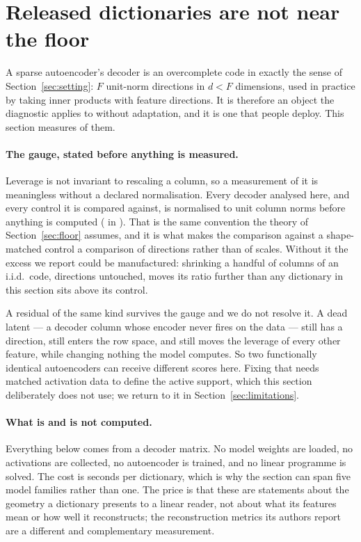 \section{Released dictionaries are not near the floor}
\label{sec:dictionaries}

A sparse autoencoder's decoder is an overcomplete code in exactly the sense of
Section~\ref{sec:setting}: $F$ unit-norm directions in $d<F$ dimensions, used in practice by taking
inner products with feature directions. It is therefore an object the diagnostic applies to without
adaptation, and it is one that people deploy. This section measures \SaeDicts{} of them.

\paragraph{The gauge, stated before anything is measured.} Leverage is not invariant to rescaling
a column, so a measurement of it is meaningless without a declared normalisation. Every decoder
analysed here, and every control it is compared against, is normalised to unit column norms before
anything is computed ( in ). That is the same
convention the theory of Section~\ref{sec:floor} assumes, and it is what makes the comparison against
a shape-matched control a comparison of directions rather than of scales. Without it the excess we
report could be manufactured: shrinking a handful of columns of an i.i.d.\ code, directions untouched,
moves its ratio further than any dictionary in this section sits above its control.

A residual of the same kind survives the gauge and we do not resolve it. A dead latent --- a decoder
column whose encoder never fires on the data --- still has a direction, still enters the row space,
and still moves the leverage of every other feature, while changing nothing the model computes. So
two functionally identical autoencoders can receive different scores here. Fixing that needs matched
activation data to define the active support, which this section deliberately does not use; we return
to it in Section~\ref{sec:limitations}.

\paragraph{What is and is not computed.} Everything below comes from a decoder matrix. No model
weights are loaded, no activations are collected, no autoencoder is trained, and no linear programme
is solved. The cost is seconds per dictionary, which is why the section can span five model families
rather than one. The price is that these are statements about the geometry a dictionary presents to a
linear reader, not about what its features mean or how well it reconstructs; the reconstruction
metrics its authors report are a different and complementary measurement.

